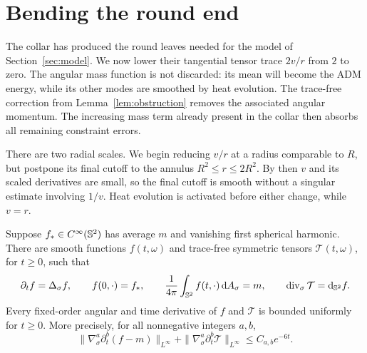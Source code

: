 \section{Bending the round end}
\label{sec:bending}

The collar has produced the round leaves needed for the model of
Section~\ref{sec:model}. We now lower their tangential tensor trace
$2v/r$ from $2$ to zero. The angular mass function is not discarded:
its mean will become the ADM energy, while its other modes are smoothed
by heat evolution. The trace-free correction from
Lemma~\ref{lem:obstruction} removes the associated angular momentum.
The increasing mass term already present in the collar then absorbs
all remaining constraint errors.

There are two radial scales. We begin reducing $v/r$ at a radius
comparable to $R$, but postpone its final cutoff to the annulus
$R^2\leq r\leq2R^2$.
By then $v$ and its scaled derivatives are small, so the final cutoff
is smooth without a singular estimate involving $1/v$. Heat evolution
is activated before either change, while $v=r$.

\begin{lemma}\label{lem:sphere-heat}
Suppose $f_*\in C^\infty(\mathbb S^2)$ has average $m$ and vanishing first
spherical harmonic. There are smooth functions $f(t,\omega)$ and
trace-free symmetric tensors $\mathcal T(t,\omega)$, for $t\geq0$,
such that
\[
 \partial_t f=\Delta_\sigma f,\qquad f(0,\cdot)=f_*,\qquad
 \frac{1}{4\pi}\int_{\mathbb S^2}f(t,\cdot)\,\mathrm dA_\sigma=m,\qquad
 \operatorname{div}_\sigma\mathcal T=\mathrm d_{\mathbb S^2}f.
\]
Every fixed-order angular and time derivative of $f$ and $\mathcal T$
is bounded uniformly for $t\geq0$. More precisely, for all nonnegative
integers $a,b$,
\[
 \|\nabla_\sigma^a\partial_t^b(f-m)\|_{L^\infty}
 +\|\nabla_\sigma^a\partial_t^b\mathcal T\|_{L^\infty}
 \leq C_{a,b}e^{-6t}.
\]
\end{lemma}


